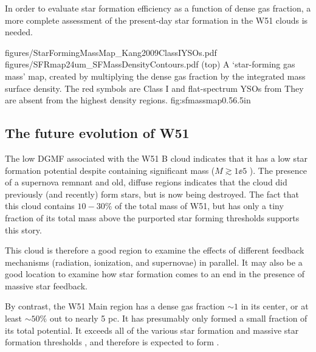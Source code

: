 In order to evaluate star formation efficiency as a
function of dense gas fraction, a more complete assessment of the present-day
 star formation in the W51 clouds is needed.

\FigureTwoAA
{figures/StarFormingMassMap_Kang2009ClassIYSOs.pdf}
{figures/SFRmap24um_SFMassDensityContours.pdf}
{(top) A `star-forming gas mass' map, created by multiplying the dense gas
fraction by the integrated \thirteenco mass surface density.  The red
symbols are Class I and flat-spectrum YSOs from \citet{Kang2009a}   They are
absent from the highest density regions.
}
{fig:sfmassmap}{0.5}{6.5in}

\subsection{The future evolution of W51}
\label{sec:futureev}
The low DGMF associated with the W51 B cloud indicates that it has a
low star formation potential despite containing significant mass
($M\gtrsim1\ee{5}$ \msun).  The presence of a supernova remnant and old,
diffuse \hii regions indicates that the cloud did previously (and recently) form
stars, but is now being destroyed.  The fact that this cloud contains $10-30\%$
of the total mass of W51, but has only a tiny fraction of its total mass above
the purported star forming thresholds supports this story.

This cloud is therefore a good region to examine the effects of different
feedback mechanisms (radiation, ionization, and supernovae) in parallel.  It
may also be a good location to examine how star formation comes to an end in
the presence of massive star feedback.

By contrast, the W51 Main region has a dense gas fraction $\sim1$ in its
center, or at least $\sim50\%$ out to nearly 5 pc.  It has presumably only
formed a small fraction
of its total potential.  It exceeds all of the various star formation and
massive star formation thresholds
\citep[e.g.][]{Lada2010a,Krumholz2008a,Kauffmann2010a}, and therefore is
expected to form .

